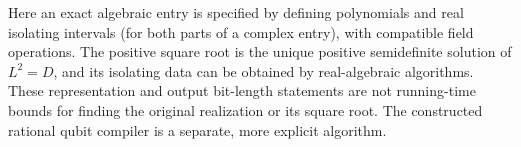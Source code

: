 Here an exact algebraic entry is specified by defining polynomials and
real isolating intervals (for both parts of a complex entry), with
compatible field operations. The positive square root is the unique
positive semidefinite solution of $L^2=D$, and its isolating data can be
obtained by real-algebraic algorithms. These representation and output
bit-length statements are not running-time bounds for finding the
original realization or its square root. The constructed rational qubit
compiler is a separate, more explicit algorithm.
